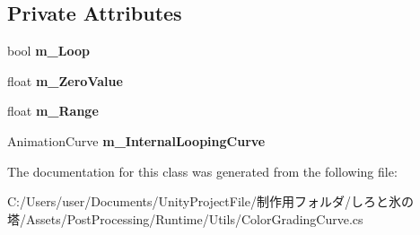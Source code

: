 \subsection*{Private Attributes}
\begin{DoxyCompactItemize}
\item 
\mbox{\label{class_unity_engine_1_1_post_processing_1_1_color_grading_curve_a10f5a3b0bf04d3eecc7c358cc665c7be}} 
bool {\bfseries m\+\_\+\+Loop}
\item 
\mbox{\label{class_unity_engine_1_1_post_processing_1_1_color_grading_curve_a4b9f07704fc1a0ec3ef1707b3d392535}} 
float {\bfseries m\+\_\+\+Zero\+Value}
\item 
\mbox{\label{class_unity_engine_1_1_post_processing_1_1_color_grading_curve_a508942ac7032e9fd1fd213c555fdebac}} 
float {\bfseries m\+\_\+\+Range}
\item 
\mbox{\label{class_unity_engine_1_1_post_processing_1_1_color_grading_curve_a08f926ba46c42d1e3af0fdafa4d73467}} 
Animation\+Curve {\bfseries m\+\_\+\+Internal\+Looping\+Curve}
\end{DoxyCompactItemize}


The documentation for this class was generated from the following file\+:\begin{DoxyCompactItemize}
\item 
C\+:/\+Users/user/\+Documents/\+Unity\+Project\+File/制作用フォルダ/しろと氷の塔/\+Assets/\+Post\+Processing/\+Runtime/\+Utils/Color\+Grading\+Curve.\+cs\end{DoxyCompactItemize}
